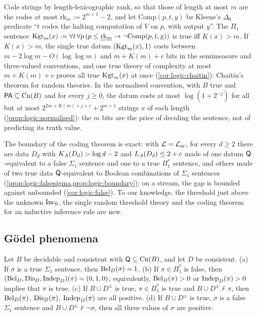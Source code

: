 Code strings by length-lexicographic rank, so that those of length at most $m$ are the codes at most $\mathrm{rk}_m:=2^{m+1}-2$, and let $\mathrm{Comp}(p,t,y)$ be Kleene's $\Delta_0$ predicate ``$t$ codes the halting computation of $V$ on $p$, with output $y$''. The $\Pi_1$ sentence $\mathrm{Kgt}_m(x):=\forall t\,\forall p\,(p\le\underline{\mathrm{rk}_m}\to\neg\mathrm{Comp}(p,t,\underline{x}))$ is true iff $K(x)>m$. If $K(x)>m$, the single true datum $(\mathrm{Kgt}_m(x),1)$ costs between $m-2\log m-O(\log\log m)$ and $m+K(m)+c$ bits in the semimeasure and three-valued conventions, and one true theory of complexity at most $m+K(m)+c$ proves all true $\mathrm{Kgt}_m(x)$ at once (\cref{cor:logic:chaitin}): Chaitin's theorem for random theories. In the normalised convention, with $B$ true and $\mathsf{PA}\subseteq\mathrm{Cn}(B)$ and for every $j\ge0$, the datum costs at most $\log(1+2^{-j})$ for all but at most $2^{2m+K(m)+j+c}+2^{m+1}$ strings $x$ of each length (\cref{prop:logic:normalised}): the $m$ bits are the price of deciding the sentence, not of predicting its truth value.

The boundary of the coding theorem is exact: with $\mathcal L=\mathcal{L}_{\mathrm{ar}}$, for every $d\ge2$ there are data $D_d$ with $K_{A}(D_d)>\log d-2$ and $L_{A}(D_d)\le2+c$ made of one datum $\mathsf{Q}$-equivalent to a false $\Sigma_1$ sentence and one to a true $\Pi_1^*$ sentence, and others made of two true data $\mathsf{Q}$-equivalent to Boolean combinations of $\Sigma_1$ sentences (\cref{prop:logic:falsesigma,prop:logic:boundary}); on a stream, the gap is bounded against unbounded (\cref{cor:logic:false}). To our knowledge, the threshold just above the unknown $\mathrm{Inc}_0$, the single random threshold theory and the coding theorem for an inductive inference rule are new.

\subsection{G\"odel phenomena}\label{sec:logic:goedel}

\begin{proposition}\label{prop:logic:shape}
Let $B$ be decidable and consistent with $\mathsf{Q}\subseteq\mathrm{Cn}(B)$, and let $D$ be consistent.
(a) If $\sigma$ is a true $\Sigma_1$ sentence, then $\mathrm{Bel}_D(\sigma)=1$.
(b) If $\pi\in\Pi_1^*$ is false, then $(\mathrm{Bel}_D,\mathrm{Dis}_D,\mathrm{Indep}_D)(\pi)=(0,1,0)$; equivalently, $\mathrm{Bel}_D(\pi)>0$ or $\mathrm{Indep}_D(\pi)>0$ implies that $\pi$ is true.
(c) If $B\cup D^\pm$ is true, $\pi\in\Pi_1^*$ is true and $B\cup D^\pm\nvdash\pi$, then $\mathrm{Bel}_D(\pi)$, $\mathrm{Dis}_D(\pi)$, $\mathrm{Indep}_D(\pi)$ are all positive.
(d) If $B\cup D^\pm$ is true, $\sigma$ is a false $\Sigma_1$ sentence and $B\cup D^\pm\nvdash\neg\sigma$, then all three values of $\sigma$ are positive.
\end{proposition}

